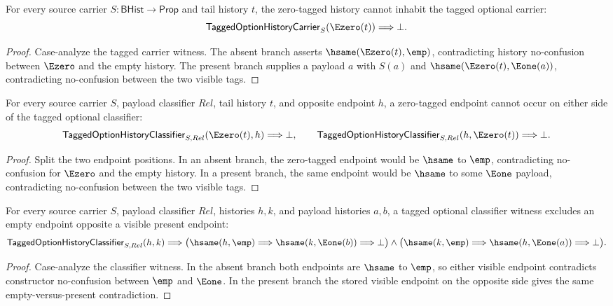 \begin{theorem}
\label{thm:tagged-option-history-carrier-e0-absurd}
For every source carrier $S:\mathsf{BHist}\to\mathsf{Prop}$ and tail history
$t$, the zero-tagged history cannot inhabit the tagged optional carrier:
$$
\mathsf{TaggedOptionHistoryCarrier}_S(\Ezero(t))\Longrightarrow\bot.
$$
\end{theorem}
\begin{proof}
Case-analyze the tagged carrier witness. The absent branch asserts
$\hsame(\Ezero(t),\emp)$, contradicting history no-confusion between
$\Ezero$ and the empty history. The present branch supplies a payload $a$ with
$S(a)$ and $\hsame(\Ezero(t),\Eone(a))$, contradicting no-confusion between
the two visible tags.
\end{proof}

\begin{theorem}
\label{thm:tagged-option-history-classifier-e0-endpoint-absurd}
For every source carrier $S$, payload classifier $Rel$, tail history $t$, and
opposite endpoint $h$, a zero-tagged endpoint cannot occur on either side of
the tagged optional classifier:
$$
\mathsf{TaggedOptionHistoryClassifier}_{S,Rel}(\Ezero(t),h)\Longrightarrow\bot,
\qquad
\mathsf{TaggedOptionHistoryClassifier}_{S,Rel}(h,\Ezero(t))\Longrightarrow\bot.
$$
\end{theorem}
\begin{proof}
Split the two endpoint positions. In an absent branch, the zero-tagged endpoint
would be $\hsame$ to $\emp$, contradicting no-confusion for $\Ezero$ and the
empty history. In a present branch, the same endpoint would be $\hsame$ to
some $\Eone$ payload, contradicting no-confusion between the two visible tags.
\end{proof}

\begin{theorem}
\label{thm:tagged-option-history-classifier-empty-visible-exclusion}
For every source carrier $S$, payload classifier $Rel$, histories $h,k$, and
payload histories $a,b$, a tagged optional classifier witness excludes an empty
endpoint opposite a visible present endpoint:
$$
\mathsf{TaggedOptionHistoryClassifier}_{S,Rel}(h,k)
\Longrightarrow
\bigl(\hsame(h,\emp)\Longrightarrow\hsame(k,\Eone(b))\Longrightarrow\bot\bigr)
\land
\bigl(\hsame(k,\emp)\Longrightarrow\hsame(h,\Eone(a))\Longrightarrow\bot\bigr).
$$
\end{theorem}
\begin{proof}
Case-analyze the classifier witness. In the absent branch both endpoints are
$\hsame$ to $\emp$, so either visible endpoint contradicts constructor
no-confusion between $\emp$ and $\Eone$. In the present branch the stored
visible endpoint on the opposite side gives the same empty-versus-present
contradiction.
\end{proof}

